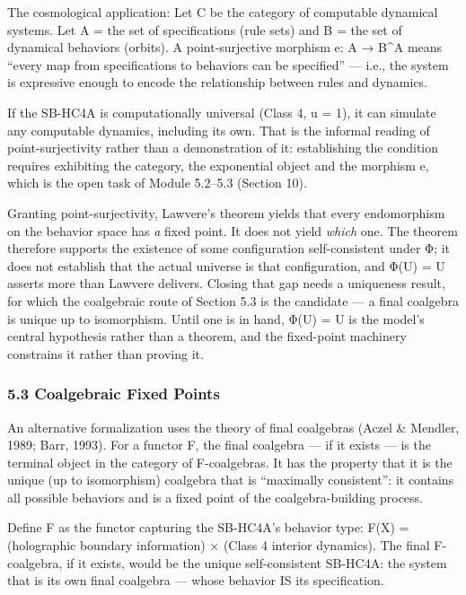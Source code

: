 \documentclass[
]{article}
\begin{document}
The cosmological application: Let C be the category of computable
dynamical systems. Let A = the set of specifications (rule sets) and B =
the set of dynamical behaviors (orbits). A point-surjective morphism e:
A → B\^{}A means ``every map from specifications to behaviors can be
specified'' --- i.e., the system is expressive enough to encode the
relationship between rules and dynamics.

If the SB-HC4A is computationally universal (Class 4, u = 1), it can
simulate any computable dynamics, including its own. That is the
informal reading of point-surjectivity rather than a demonstration of
it: establishing the condition requires exhibiting the category, the
exponential object and the morphism e, which is the open task of Module
5.2--5.3 (Section 10).

Granting point-surjectivity, Lawvere's theorem yields that every
endomorphism on the behavior space has \emph{a} fixed point. It does not
yield \emph{which} one. The theorem therefore supports the existence of
some configuration self-consistent under Φ; it does not establish that
the actual universe is that configuration, and Φ(U) = U asserts more
than Lawvere delivers. Closing that gap needs a uniqueness result, for
which the coalgebraic route of Section 5.3 is the candidate --- a final
coalgebra is unique up to isomorphism. Until one is in hand, Φ(U) = U is
the model's central hypothesis rather than a theorem, and the
fixed-point machinery constrains it rather than proving it.

\hypertarget{coalgebraic-fixed-points}{%
\subsubsection{5.3 Coalgebraic Fixed
Points}\label{coalgebraic-fixed-points}}

An alternative formalization uses the theory of final coalgebras (Aczel
\& Mendler, 1989; Barr, 1993). For a functor F, the final coalgebra ---
if it exists --- is the terminal object in the category of F-coalgebras.
It has the property that it is the unique (up to isomorphism) coalgebra
that is ``maximally consistent'': it contains all possible behaviors and
is a fixed point of the coalgebra-building process.

Define F as the functor capturing the SB-HC4A's behavior type: F(X) =
(holographic boundary information) × (Class 4 interior dynamics). The
final F-coalgebra, if it exists, would be the unique self-consistent
SB-HC4A: the system that is its own final coalgebra --- whose behavior
IS its specification.
\end{document}
